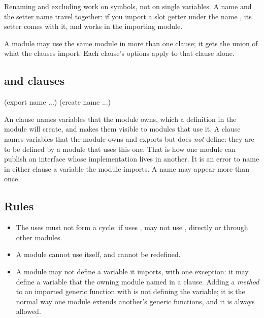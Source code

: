 \noindent
Renaming and excluding work on symbols, not on single variables. A name
 and the setter name  travel together: if
you import a slot getter  under the name , its setter
comes with it, and  works in the importing module.

A module may use the same module in more than one clause; it gets the
union of what the clauses import. Each clause's options apply to that
clause alone.

\subsection{ and  clauses}\label{sec:modules-export}

\begin{dylan}
(export name ...)
(create name ...)
\end{dylan}

\noindent
An  clause names variables that the module owns, which a
definition in the module will create, and makes them visible to modules
that use it. A  clause names variables that the module owns
and exports but does \emph{not} define: they are to be defined by a module
that uses this one. That is how one module can publish an interface whose
implementation lives in another. It is an error to name in either clause
a variable the module imports. A name may appear more than once.

\subsection{Rules}\label{sec:modules-rules}

\begin{itemize}
\item The uses must not form a cycle: if  uses , 
  may not use , directly or through other modules.
\item A module cannot use itself, and  cannot be redefined.
\item A module may not define a variable it imports, with one exception:
  it may define a variable that the owning module named in a
   clause. Adding a \emph{method} to an imported generic
  function with  is not defining the variable; it is
  the normal way one module extends another's generic functions, and it
  is always allowed.
\end{itemize}

